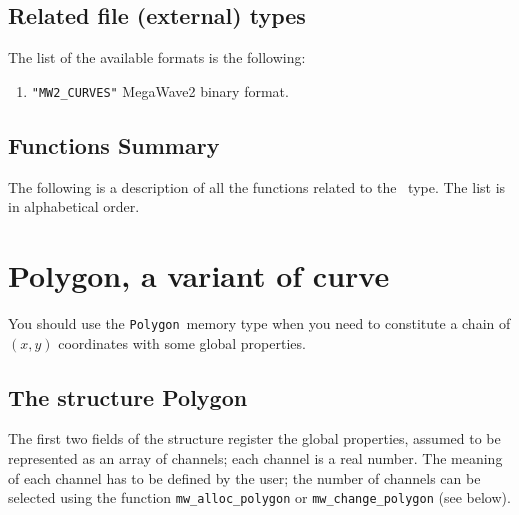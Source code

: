 \subsection{Related file (external) types}
\label{curves-polygons_curves-file_type}

The list of the available formats is the following:
\begin{enumerate}
\item \verb+"MW2_CURVES"+ MegaWave2 binary format.
\end{enumerate}

\subsection{Functions Summary}
\label{curves-polygons_curves_function}

The following is a description of all the functions related to 
the \curves\ type. The list is in alphabetical order.

\newpage %



\section{Polygon, a variant of curve}


\label{curves-polygons_polygon}

\def\polygon{{\tt Polygon}}
\index{structure!\polygon}

You should use the \polygon\ memory type when you need to constitute a 
chain of $(x,y)$ coordinates with some global properties.

\subsection{The structure Polygon}
\label{curves-polygons_polygon_structure}

The first two fields of the structure register the global properties,
assumed to be represented as an array of channels; each channel is
a real number. 
The meaning of each channel has to be defined by the user; the number
of channels can be selected using the function \verb+mw_alloc_polygon+
or \verb+mw_change_polygon+ (see below).

